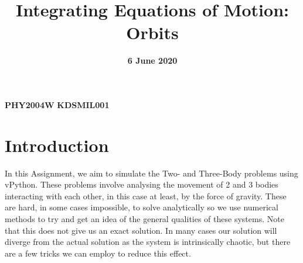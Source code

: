 \documentclass[12pt]{article}
\title{Integrating Equations of Motion: Orbits}
\date{\textbf{6 June 2020}}
\author{}
\begin{document}
    \maketitle
    \begin{center}
    \textbf{\large{PHY2004W}}
    \textbf{\large{KDSMIL001}}
    \end{center}
    \tableofcontents
    
    \section{Introduction}
    In this Assignment, we aim to simulate the Two- and Three-Body problems using vPython. These problems 
    involve analysing the movement of 2 and 3 bodies interacting with each other, in this case at least, 
    by the force of gravity. These are hard, in some cases impossible, to solve analytically so we use 
    numerical methods to try and get an idea of the general qualities of these systems. Note that this 
    does not give us an exact solution. In many cases our solution will diverge from the actual solution 
    as the system is intrinsically chaotic, but there are a few tricks we can employ to reduce this effect.
\end{document}
